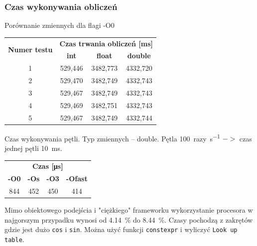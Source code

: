 		\begin{frame}
		\frametitle{Czas wykonywania obliczeń}
		\tiny
		Porównanie zmiennych dla flagi -O0
		\begin{table}[ht]
			\centering
			\begin{tabular}{|c|c|c|c|}
				\hline
				\multirow{ 2}{*}{\textbf{Numer testu}} & \multicolumn{3}{c|}{\textbf{Czas trwania obliczeń [\si{\milli\second}]}}     \\ \cline{2-4} 
				& \textbf{int} & \textbf{float}   & \textbf{double}      \\ \hline \hline
				1           & 529,446    & 3482,773 & 4332,720     \\ \hline
				2           & 529,470    & 3482,749 & 4332,743     \\ \hline
				3           & 529,467    & 3482,749 & 4332,743     \\ \hline
				4           & 529,469    & 3482,751 & 4332,743     \\ \hline
				5           & 529,467    & 3482,749 & 4332,744     \\ \hline
			\end{tabular}
		\end{table}
			Czas wykonywania pętli. Typ zmiennych -- double. Pętla \SI{100}{razy\per\second} $->$ czas jednej pętli \SI{10}{\milli\second}.
			\begin{table}
			\centering
				\begin{tabular}{|c|c|c|c|}
					\hline
					\multicolumn{4}{|c|}{\textbf{Czas [\si{\micro\second}]}}     \\ \cline{1-4} 
					\textbf{-O0} & \textbf{-Os}   & \textbf{-O3} & \textbf{-Ofast}       \\ \hline \hline
					844    & 452 & 450 & 414     \\ \hline
				\end{tabular}
			\end{table}
			Mimo obiektowego podejścia i "ciężkiego" frameworku wykorzystanie procesora w najgorszym przypadku wynosi od \SI{4.14}{\percent} do \SI{8.44}{\percent}. Czasy pochodzą z zakrętów gdzie jest dużo \texttt{cos} i \texttt{sin}. Można użyć funkcji \texttt{constexpr} i wyliczyć \texttt{Look up table}.
			

\end{frame}
